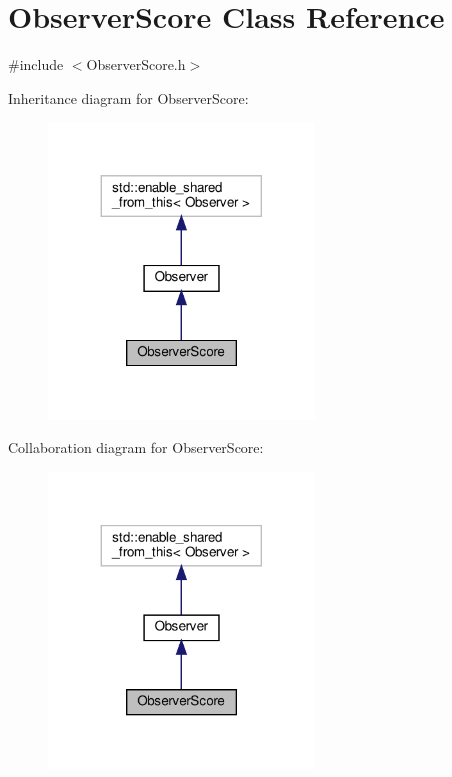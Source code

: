 \hypertarget{classObserverScore}{}\section{Observer\+Score Class Reference}
\label{classObserverScore}


{\ttfamily \#include $<$Observer\+Score.\+h$>$}



Inheritance diagram for Observer\+Score\+:\nopagebreak
\begin{figure}[H]
\begin{center}
\leavevmode
\includegraphics[width=200pt]{classObserverScore__inherit__graph}
\end{center}
\end{figure}


Collaboration diagram for Observer\+Score\+:\nopagebreak
\begin{figure}[H]
\begin{center}
\leavevmode
\includegraphics[width=200pt]{classObserverScore__coll__graph}
\end{center}
\end{figure}
